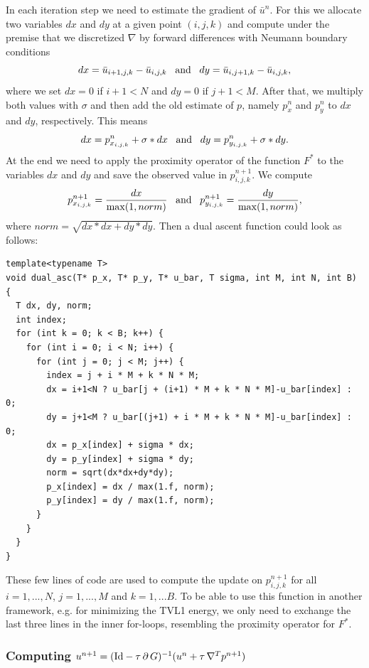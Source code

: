 \documentclass[abstracton]{scrreprt}
\begin{document}
                In each iteration step we need to estimate the gradient of $\bar{u}^{n}$. For this we allocate two variables $dx$ and $dy$ at a given point $(i,j,k)$ and compute under the premise that we discretized $\nabla$ by forward differences with Neumann boundary conditions
                    $$
                        dx = \bar{u}_{i+1,j,k} - \bar{u}_{i,j,k} \,\,\,\,\, \textnormal{and} \,\,\,\,\, dy = \bar{u}_{i,j+1,k} - \bar{u}_{i,j,k},
                    $$
                where we set $dx = 0$ if $i + 1 < N$ and $dy = 0$ if $j + 1 < M$.
                After that, we multiply both values with $\sigma$ and then add the old estimate of $p$, namely $p_{x}^{n}$ and $p_{y}^{n}$ to $dx$ and $dy$, respectively. This means
                    $$
                        dx = p_{x_{i,j,k}}^{n} + \sigma * dx \,\,\,\,\, \textnormal{and} \,\,\,\,\, dy = p_{y_{i,j,k}}^{n} + \sigma * dy.
                    $$
                At the end we need to apply the proximity operator of the function $F^{\ast}$ to the variables $dx$ and $dy$ and save the observed value in $p_{i,j,k}^{n+1}$. We compute
                    $$
                        p_{x_{i,j,k}}^{n+1} = \frac{dx}{\max(1, norm)} \,\,\,\,\, \textnormal{and} \,\,\,\,\, p_{y_{i,j,k}}^{n+1} = \frac{dy}{\max(1, norm)},
                    $$
                where $norm = \sqrt{dx*dx+dy*dy}$. Then a dual ascent function could look as follows:
                \begin{lstlisting}
template<typename T>
void dual_asc(T* p_x, T* p_y, T* u_bar, T sigma, int M, int N, int B) {
  T dx, dy, norm;
  int index;
  for (int k = 0; k < B; k++) {
    for (int i = 0; i < N; i++) {
      for (int j = 0; j < M; j++) {
        index = j + i * M + k * N * M;
        dx = i+1<N ? u_bar[j + (i+1) * M + k * N * M]-u_bar[index] : 0;
        dy = j+1<M ? u_bar[(j+1) + i * M + k * N * M]-u_bar[index] : 0;
        dx = p_x[index] + sigma * dx;
        dy = p_y[index] + sigma * dy;
        norm = sqrt(dx*dx+dy*dy);
        p_x[index] = dx / max(1.f, norm);
        p_y[index] = dy / max(1.f, norm);
      }
    }
  }
}
                \end{lstlisting}
            These few lines of code are used to compute the update on $p_{i,j,k}^{n+1}$ for all $i = 1, ..., N$, $j = 1, ..., M$ and $k = 1, ... B$. To be able to use this function in another framework, e.g. for minimizing the TVL1 energy, we only need to exchange the last three lines in the inner for-loops, resembling the proximity operator for $F^{\ast}$.

            \subsubsection{Computing $u^{n+1} = (\textnormal{Id} - \tau\,\partial\,G)^{-1}(u^{n} + \tau\,\nabla^{T}p^{n+1})$}
            \label{sub:computing_u}
\end{document}
